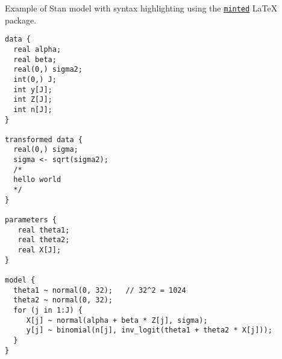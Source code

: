 \documentclass{article}
\begin{document}
Example of Stan model with syntax highlighting using the
\href{http://code.google.com/p/minted/}{\texttt{minted}} \LaTeX
package.

\begin{verbatim}
data {
  real alpha; 
  real beta; 
  real(0,) sigma2; 
  int(0,) J; 
  int y[J]; 
  int Z[J]; 
  int n[J]; 
} 

transformed data {
  real(0,) sigma; 
  sigma <- sqrt(sigma2); 
  /* 
  hello world
  */
} 

parameters {
   real theta1; 
   real theta2; 
   real X[J]; 
} 

model {
  theta1 ~ normal(0, 32);   // 32^2 = 1024 
  theta2 ~ normal(0, 32); 
  for (j in 1:J) {
     X[j] ~ normal(alpha + beta * Z[j], sigma); 
     y[j] ~ binomial(n[j], inv_logit(theta1 + theta2 * X[j]));
  }
}
\end{verbatim}
\end{document}
